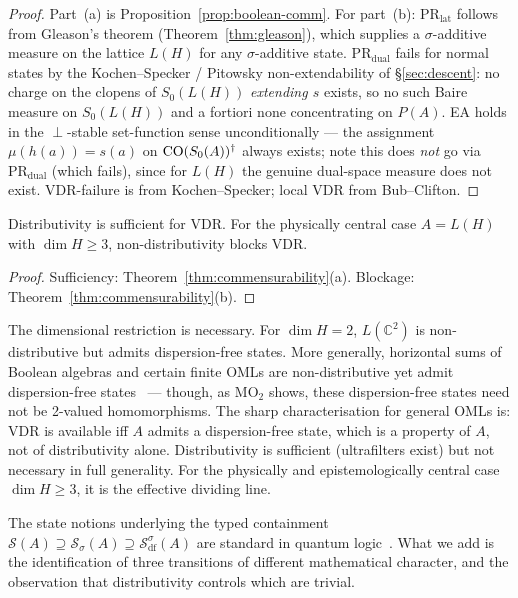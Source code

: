 \begin{proof}
Part~(a) is Proposition~\ref{prop:boolean-comm}.  For
part~(b): $\text{PR}_{\text{lat}}$ follows from Gleason's theorem
(Theorem~\ref{thm:gleason}), which supplies a $\sigma$-additive measure
on the lattice $L(H)$ for any $\sigma$-additive state.
$\text{PR}_{\text{dual}}$ fails for normal states by the
Kochen--Specker / Pitowsky non-extendability of \S\ref{sec:descent}: no
charge on the clopens of $S_0(L(H))$ \emph{extending $s$} exists, so no
such Baire measure on $S_0(L(H))$ and a fortiori none concentrating on
$P(A)$.  EA holds in the $\perp$-stable set-function sense
unconditionally --- the assignment $\mu(h(a)) = s(a)$ on
$\mathrm{CO}(S_0(A))^\dagger$ always exists; note this does \emph{not} go via
$\text{PR}_{\text{dual}}$ (which fails), since for $L(H)$ the genuine
dual-space measure does not exist.  VDR-failure is from
Kochen--Specker; local VDR from Bub--Clifton.
\end{proof}

\begin{corollary}
\label{cor:distributivity}
Distributivity is sufficient for VDR.  For the physically central
case $A = L(H)$ with $\dim H \geq 3$, non-distributivity blocks
VDR.
\end{corollary}

\begin{proof}
Sufficiency: Theorem~\ref{thm:commensurability}(a).  Blockage:
Theorem~\ref{thm:commensurability}(b).
\end{proof}

\begin{remark}
The dimensional restriction is necessary.  For $\dim H = 2$,
$L(\mathbb{C}^2)$ is non-distributive but admits dispersion-free
states.  More generally, horizontal sums of Boolean algebras and
certain finite OMLs are non-distributive yet admit dispersion-free
states~\cite[Chapter~4]{Kalmbach1983} --- though, as $\mathrm{MO}_2$ shows,
these dispersion-free states need not be 2-valued homomorphisms.
The sharp characterisation for general OMLs is: VDR is available
iff $A$ admits a dispersion-free state, which is a property of $A$,
not of distributivity alone.  Distributivity is sufficient
(ultrafilters exist) but not necessary in full generality.  For
the physically and epistemologically central case $\dim H \geq 3$,
it is the effective dividing line.
\end{remark}

The state notions underlying the typed containment
$\mathcal{S}(A) \supseteq \mathcal{S}_\sigma(A)
\supseteq \mathcal{S}_{\mathrm{df}}^\sigma(A)$ are standard in quantum
logic~\cite{PtakPulmannova1991, Kalmbach1983}.  What we add is the
identification of three transitions of different mathematical
character, and the observation that distributivity controls which
are trivial.

